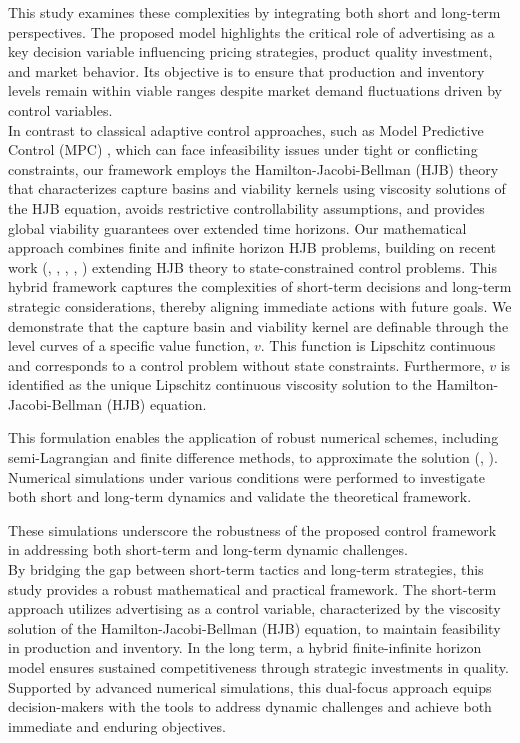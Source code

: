 \documentclass[]{interact}
\theoremstyle{plain}%
\theoremstyle{definition}
\theoremstyle{remark}
\begin{document}
This study examines these complexities by integrating both short and long-term perspectives. The proposed model highlights the critical role of advertising as a key decision variable influencing pricing strategies, product quality investment, and market behavior. Its objective is to ensure that production and inventory levels remain within viable ranges despite market demand fluctuations driven by control variables. \\%
 In contrast to classical adaptive control approaches, such as Model Predictive Control (MPC) \cite{kumar2012model}, which can face infeasibility issues under tight or conflicting constraints, our framework employs the Hamilton-Jacobi-Bellman (HJB) theory that characterizes capture basins and viability kernels using viscosity solutions of the HJB equation, avoids restrictive controllability assumptions, and provides global viability guarantees over extended time horizons. %
Our mathematical approach combines finite and infinite horizon HJB problems, building on recent work (\cite{rashkov2021model}, \cite{rashkov2022modeling}, \cite{altarovici2013general}, \cite{bokanowski2006anti}, \cite{assellaou2018value}) extending HJB theory to state-constrained control problems. This hybrid framework captures the complexities of short-term decisions and long-term strategic considerations, thereby aligning immediate actions with future goals. We demonstrate that the capture basin and viability kernel are definable through the level curves of a specific value function, $v$. This function is Lipschitz continuous and corresponds to a control problem without state constraints. Furthermore, $v$ is identified as the unique Lipschitz continuous viscosity solution to the Hamilton-Jacobi-Bellman (HJB) equation. %

This formulation enables the application of robust numerical schemes, including semi-Lagrangian and finite difference methods, to approximate the solution (\cite{assellaou2018value}, \cite{bokanowski2006anti}). Numerical simulations under various conditions were performed to investigate both short and long-term dynamics and validate the theoretical framework. %

These simulations underscore the robustness of the proposed control framework in addressing both short-term and long-term dynamic challenges.\\
By bridging the gap between short-term tactics and long-term strategies, this study provides a robust mathematical and practical framework. The short-term approach utilizes advertising as a control variable, characterized by the viscosity solution of the Hamilton-Jacobi-Bellman (HJB) equation, to maintain feasibility in production and inventory. In the long term, a hybrid finite-infinite horizon model ensures sustained competitiveness through strategic investments in quality. Supported by advanced numerical simulations, this dual-focus approach equips decision-makers with the tools to address dynamic challenges and achieve both immediate and enduring objectives.
\end{document}
